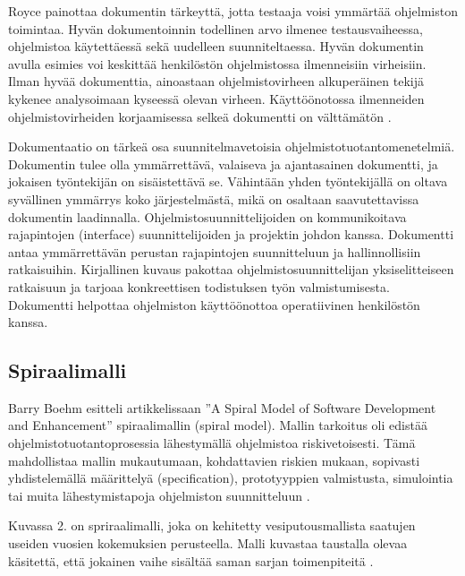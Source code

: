 \documentclass[finnish]{tktltiki2}
\theoremstyle{definition}
\theoremstyle{remark}
\begin{document}
Royce painottaa dokumentin tärkeyttä, jotta testaaja voisi ymmärtää ohjelmiston toimintaa. Hyvän dokumentoinnin todellinen arvo ilmenee testausvaiheessa, ohjelmistoa käytettäessä sekä uudelleen suunniteltaessa. Hyvän dokumentin avulla esimies voi keskittää henkilöstön ohjelmistossa ilmenneisiin virheisiin. Ilman hyvää dokumenttia, ainoastaan ohjelmistovirheen alkuperäinen tekijä kykenee analysoimaan kyseessä olevan virheen. Käyttöönotossa ilmenneiden ohjelmistovirheiden korjaamisessa selkeä dokumentti on välttämätön \cite{ROY70}.

Dokumentaatio on tärkeä osa suunnitelmavetoisia ohjelmistotuotantomenetelmiä. Dokumentin tulee olla ymmärrettävä, valaiseva ja ajantasainen dokumentti, ja jokaisen työntekijän on sisäistettävä se. Vähintään yhden työntekijällä on oltava syvällinen ymmärrys koko järjestelmästä, mikä on osaltaan saavutettavissa dokumentin laadinnalla. Ohjelmistosuunnittelijoiden on kommunikoitava rajapintojen (interface) suunnittelijoiden ja projektin johdon kanssa. Dokumentti antaa ymmärrettävän perustan rajapintojen suunnitteluun ja hallinnollisiin ratkaisuihin. Kirjallinen kuvaus pakottaa ohjelmistosuunnittelijan yksiselitteiseen ratkaisuun ja tarjoaa konkreettisen todistuksen työn valmistumisesta. Dokumentti helpottaa ohjelmiston käyttöönottoa operatiivinen henkilöstön kanssa.  	  

\subsection{Spiraalimalli}

Barry Boehm esitteli artikkelissaan ''A Spiral Model of Software Development and Enhancement'' spiraalimallin (spiral model). Mallin tarkoitus oli edistää ohjelmistotuotantoprosessia lähestymällä ohjelmistoa riskivetoisesti. Tämä mahdollistaa mallin mukautumaan, kohdattavien riskien mukaan, sopivasti yhdistelemällä määrittelyä (specification), prototyyppien valmistusta, simulointia tai muita lähestymistapoja ohjelmiston suunnitteluun \cite{BOE88}.


Kuvassa 2. on spriraalimalli, joka on kehitetty vesiputousmallista saatujen useiden vuosien kokemuksien perusteella. Malli kuvastaa taustalla olevaa käsitettä, että jokainen vaihe sisältää saman sarjan toimenpiteitä \cite{BOE88}.
\end{document}
